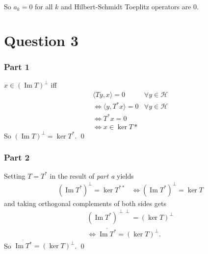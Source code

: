 \documentclass{unswmaths}
\begin{document}
So $ a_k =0 $ for all $ k $ and Hilbert-Schmidt Toeplitz operators are $ 0 $.

\newpage
\section*{Question 3}
\subsubsection*{Part 1}
$ x \in (\operatorname{Im} T)^\perp $ iff
\begin{align*}
    & \langle Ty, x \rangle = 0 &\forall y \in \mathcal{H}\\
    & \Leftrightarrow \langle y, T^* x \rangle = 0 & \forall y \in \mathcal{H} \\
    & \Leftrightarrow T^* x = 0 \\
    & \Leftrightarrow x \in \ker T*
\end{align*}
So $ (\operatorname{Im} T)^\perp = \ker T^* $. \qed

\subsubsection*{Part 2}
Setting $ T = T^* $ in the result of \emph{part a} yields
\begin{align*}
    &(\operatorname{Im} T^*)^\perp = \ker T^{**}
    & \Leftrightarrow  (\operatorname{Im} T^*)^\perp = \ker T
\end{align*}
and taking orthogonal complements of both sides gets
\begin{align*}
    & (\operatorname{Im} T^*)^{\perp \perp} = (\ker T)^\perp \\
    & \Leftrightarrow \overline{\operatorname{Im} T^*} = (\ker T)^\perp.
\end{align*}
So $ \overline{\operatorname{Im} T^*} = (\ker T)^\perp $. \qed
\end{document}
